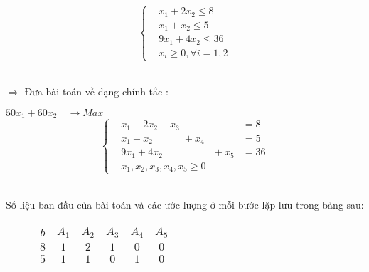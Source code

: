 \documentclass{article}
\begin{document}
\begin{enumerate}
\begin{center}
    \[\left\{\begin{aligned}
        &x_1+2x_2\leq 8 \\
        &x_1+x_2\leq 5 \\
        &9x_1+4x_2\leq 36 \\
        &x_i\geq 0,\forall i=1,2
    \end{aligned}\right.\]\\
    \end{center}
    $\Longrightarrow$ Đưa bài toán về dạng chính tắc :
    \begin{center}
        $50x_1+60x_2\quad \longrightarrow Max$\\
        \[\left\{\begin{aligned}
            &x_1+2x_2+x_3 \quad \quad &= 8 \\
            &x_1+x_2 \quad \quad \quad + x_4 \quad &= 5 \\
            &9x_1+4x_2 \quad \quad \quad \quad \quad   + x_5 &= 36 \\
            &x_1,x_2,x_3,x_4,x_5\geq 0
        \end{aligned}\right.\]\\
    \end{center}    
        Số liệu ban đầu của bài toán và các ước lượng ở mỗi bước lặp lưu trong bảng sau:
        \begin{figure}[H]
            \begin{center}
                \begin{tabular}{|c|c|c|c|c|c|}
                    \hline
                    $b$ & 
                    $A_{1}$ & 
                    $A_{2}$ & 
                    $A_{3}$ & 
                    $A_{4}$ & 
                    $A_{5}$ \\
                    \hline
                    \cellcolor[rgb]{0, .69, .941}$8$ & 
                    \cellcolor[rgb]{1, .753, .0}$1$ & 
                    \cellcolor[rgb]{1, .753, .0}$2$ & 
                    \cellcolor[rgb]{1, .753, .0}$1$ & 
                    \cellcolor[rgb]{1, .753, .0}$0$ & 
                    \cellcolor[rgb]{1, .753, .0}$0$ \\
                    \hline
                    \cellcolor[rgb]{0, .69, .941}$5$ & 
                    \cellcolor[rgb]{1, .753, .0}$1$ & 
                    \cellcolor[rgb]{1, .753, .0}$1$ & 
                    \cellcolor[rgb]{1, .753, .0}$0$ & 
                    \cellcolor[rgb]{1, .753, .0}$1$ & 
                    \cellcolor[rgb]{1, .753, .0}$0$ \\

\end{tabular}
\end{center}
\end{figure}
\end{enumerate}
\end{document}

